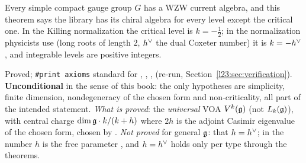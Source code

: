 \begin{physics}
Every simple compact gauge group $G$ has a WZW current algebra, and this theorem says the library has its chiral algebra
for every level except the critical one. In the Killing normalization the critical level is $k=-\frac12$; in the
normalization physicists use (long roots of length $2$, $h^\vee$ the dual Coxeter number) it is $k=-h^\vee$, and
integrable levels are positive integers.
\end{physics}

\begin{status}
Proved; \texttt{\#print axioms} standard for , ,
,  (re-run, Section~\ref{l23:sec:verification}).
\textbf{Unconditional} in the sense of this book: the only hypotheses are simplicity, finite dimension, nondegeneracy of the
chosen form and non-criticality, all part of the intended statement. \emph{What is proved}: the \emph{universal} VOA $V^k(\mathfrak g)$
(not $L_k(\mathfrak g)$), with central charge $\dim\mathfrak g\cdot k/(k+h)$ where $2h$ is the adjoint Casimir eigenvalue of the chosen form,
chosen by . \emph{Not proved} for general $\mathfrak g$: that $h=h^\vee$; in  the number
$h$ is the free parameter , and $h=h^\vee$ holds only per type through the  theorems.
\end{status}

